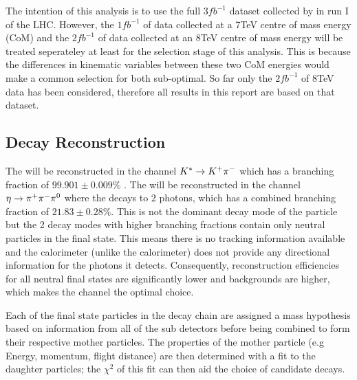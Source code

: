 The intention of this analysis is to use the full $3fb^{-1}$ dataset collected by \lhcb in run I of the LHC.  However, the $1fb^{-1}$ of data collected at a 7TeV centre of mass energy (CoM) and the $2fb^{-1}$ of data collected at an 8TeV centre of mass energy will be treated seperateley at least for the selection stage of this analysis.  This is because the differences in kinematic variables between these two CoM energies would make a common selection for both sub-optimal. So far only the $2fb^{-1}$ of 8TeV data has been considered, therefore all results in this report are based on that dataset.

\subsection{Decay Reconstruction}
\label{sec:Decay Reconstruction}
The \Kstar will be reconstructed in the channel ${{K}^*} \rightarrow {\ensuremath{{K}^+}}{\ensuremath{{\pi}^-}}$ which has a branching fraction of $99.901\pm0.009\%$ \cite{PDG2014}.  The \etaz will be reconstructed in the channel $\eta \rightarrow {\ensuremath{{\pi}^+}}{\ensuremath{{\pi}^-}}{\ensuremath{{\pi}^0}}$ where the \piz decays to 2 photons, which has a combined branching fraction of $21.83\pm0.28\%$\cite{PDG2014}.  This is not the dominant decay mode of the \etaz particle but the 2 decay modes with higher branching fractions contain only neutral particles in the final state.  This means there is no tracking information available and the \lhcb calorimeter (unlike the \atlas calorimeter) does not provide any directional information for the photons it detects.  Consequently, reconstruction efficiencies for all neutral final states are significantly lower and backgrounds are higher, which makes the \pip\pim\piz channel the optimal choice.  

Each of the final state particles in the decay chain are assigned a mass hypothesis based on information from all of the \lhcb sub detectors before being combined to form their respective mother particles.  The properties of the mother particle (e.g Energy, momentum, flight distance) are then determined with a fit to the daughter particles;   the $\chi^2$ of this fit can then aid the choice of candidate decays.

